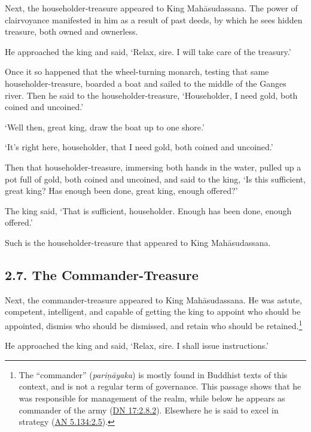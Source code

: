 \documentclass[12pt,openany]{book}%
\begin{document}
Next, the householder-treasure appeared to King \textsanskrit{Mahāsudassana}. The power of clairvoyance manifested in him as a result of past deeds, by which he sees hidden treasure, both owned and ownerless. 

He approached the king and said, ‘Relax, sire. I will take care of the treasury.’ 

Once it so happened that the wheel-turning monarch, testing that same householder-treasure, boarded a boat and sailed to the middle of the Ganges river. Then he said to the householder-treasure, ‘Householder, I need gold, both coined and uncoined.’ 

‘Well then, great king, draw the boat up to one shore.’ 

‘It’s right here, householder, that I need gold, both coined and uncoined.’ 

Then that householder-treasure, immersing both hands in the water, pulled up a pot full of gold, both coined and uncoined, and said to the king, ‘Is this sufficient, great king? Has enough been done, great king, enough offered?’ 

The king said, ‘That is sufficient, householder. Enough has been done, enough offered.’ 

Such is the householder-treasure that appeared to King \textsanskrit{Mahāsudassana}. 

\subsection*{2.7. The Commander-Treasure }

Next, the commander-treasure appeared to King \textsanskrit{Mahāsudassana}. He was astute, competent, intelligent, and capable of getting the king to appoint who should be appointed, dismiss who should be dismissed, and retain who should be retained.\footnote{The “commander” (\textit{\textsanskrit{pariṇāyaka}}) is mostly found in Buddhist texts of this context, and is not a regular term of governance. This passage shows that he was responsible for management of the realm, while below he appears as commander of the army (\href{https://suttacentral.net/dn17/en/sujato\#2.8.2}{DN 17:2.8.2}). Elsewhere he is said to excel in strategy (\href{https://suttacentral.net/an5.134/en/sujato\#2.5}{AN 5.134:2.5}). } 

He approached the king and said, ‘Relax, sire. I shall issue instructions.’ 
\end{document}
